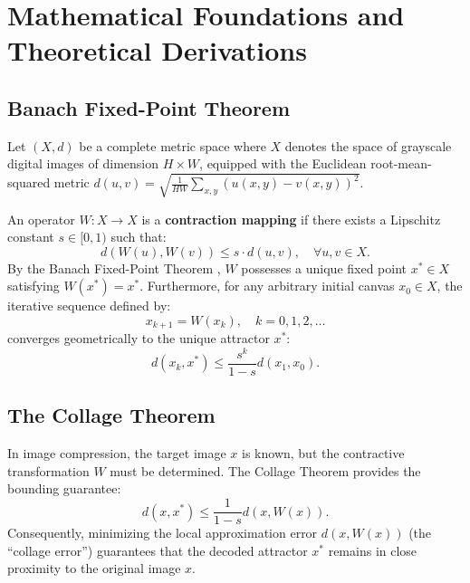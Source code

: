 \documentclass[11pt,a4paper]{article}
\begin{document}
\section{Mathematical Foundations and Theoretical Derivations}
\label{sec:math}

\subsection{Banach Fixed-Point Theorem}
Let $(X, d)$ be a complete metric space where $X$ denotes the space of grayscale digital images of dimension $H \times W$, equipped with the Euclidean root-mean-squared metric $d(u, v) = \sqrt{\frac{1}{HW}\sum_{x,y} (u(x,y) - v(x,y))^2}$.

An operator $W: X \to X$ is a \textbf{contraction mapping} if there exists a Lipschitz constant $s \in [0, 1)$ such that:
\begin{equation}
    d(W(u), W(v)) \le s \cdot d(u, v), \quad \forall u, v \in X.
\end{equation}
By the Banach Fixed-Point Theorem \cite{banach1922operations}, $W$ possesses a unique fixed point $x^* \in X$ satisfying $W(x^*) = x^*$. Furthermore, for any arbitrary initial canvas $x_0 \in X$, the iterative sequence defined by:
\begin{equation}
    x_{k+1} = W(x_k), \quad k = 0, 1, 2, \dots
\end{equation}
converges geometrically to the unique attractor $x^*$:
\begin{equation}
    d(x_k, x^*) \le \frac{s^k}{1 - s} d(x_1, x_0).
\end{equation}

\subsection{The Collage Theorem}
In image compression, the target image $x$ is known, but the contractive transformation $W$ must be determined. The Collage Theorem \cite{barnsley1988fractals} provides the bounding guarantee:
\begin{equation}
    d(x, x^*) \le \frac{1}{1 - s} d(x, W(x)).
\end{equation}
Consequently, minimizing the local approximation error $d(x, W(x))$ (the ``collage error'') guarantees that the decoded attractor $x^*$ remains in close proximity to the original image $x$.
\end{document}
